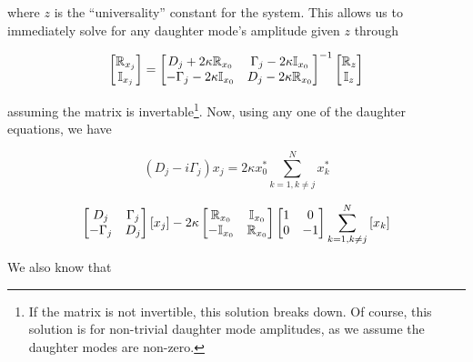 where $z$ is the ``universality'' constant for the system. This allows us to immediately solve for any daughter mode's amplitude given $z$ through

\begin{equation}
\begin{bmatrix}
\mathbb{R}_{x_j} \\
\mathbb{I}_{x_j} \\
\end{bmatrix}
=
\begin{bmatrix}
D_j + 2\kappa\mathbb{R}_{x_0}      &   \Gamma_j - 2\kappa\mathbb{I}_{x_0} \\
-\Gamma_j -2\kappa\mathbb{I}_{x_0} &   D_j - 2\kappa\mathbb{R}_{x_0} \\
\end{bmatrix}^{-1}
\begin{bmatrix}
\mathbb{R}_{z} \\
\mathbb{I}_{z} \\
\end{bmatrix}
\end{equation}

assuming the matrix is invertable\footnote{If the matrix is not invertible, this solution breaks down. Of course, this solution is for non-trivial daughter mode amplitudes, as we assume the daughter modes are non-zero.}. Now, using any one of the daughter equations, we have


\begin{equation}
(D_j -i\Gamma_j)x_j = 2\kappa x_0^\ast \sum_{k=1,k\neq j}^{N} x_k^\ast
\end{equation}

\begin{equation}
\begin{bmatrix}
D_j & \Gamma_j \\
-\Gamma_j & D_j \\
\end{bmatrix}
\left[x_j \right]
- 2\kappa
\begin{bmatrix}
\mathbb{R}_{x_0} & \mathbb{I}_{x_0} \\
-\mathbb{I}_{x_0} & \mathbb{R}_{x_0} \\
\end{bmatrix}
\begin{bmatrix}
1 & 0 \\
0 & -1 \\
\end{bmatrix}
\sum_{k=1,k\neq j}^{N}\left[x_k\right]
\end{equation}

We also know that

